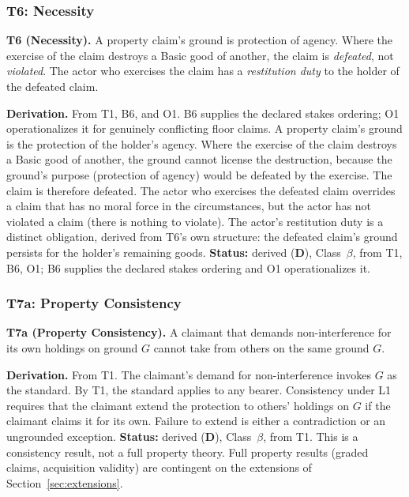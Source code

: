 \documentclass[11pt]{article}
\newcommand{\statusD}{\textcolor{stD}{\textbf{D}}}
\newcommand{\cb}{\texorpdfstring{Class~$\beta$}{Class beta}}
\begin{document}
\subsubsection{T6: Necessity}
\begin{paperbox}
\textbf{T6 (Necessity).} A property claim's ground is protection of agency. Where the exercise of the claim destroys a Basic good of another, the claim is \emph{defeated}, not \emph{violated}. The actor who exercises the claim has a \emph{restitution duty} to the holder of the defeated claim.
\end{paperbox}
\textbf{Derivation.} From T1, B6, and O1. B6 supplies the declared stakes ordering; O1 operationalizes it for genuinely conflicting floor claims. A property claim's ground is the protection of the holder's agency. Where the exercise of the claim destroys a Basic good of another, the ground cannot license the destruction, because the ground's purpose (protection of agency) would be defeated by the exercise. The claim is therefore defeated. The actor who exercises the defeated claim overrides a claim that has no moral force in the circumstances, but the actor has not violated a claim (there is nothing to violate). The actor's restitution duty is a distinct obligation, derived from T6's own structure: the defeated claim's ground persists for the holder's remaining goods. \textbf{Status:} derived (\statusD{}), \cb{}, from T1, B6, O1; B6 supplies the declared stakes ordering and O1 operationalizes it.

\subsubsection{T7a: Property Consistency}
\begin{paperbox}
\textbf{T7a (Property Consistency).} A claimant that demands non-interference for its own holdings on ground $G$ cannot take from others on the same ground $G$.
\end{paperbox}
\textbf{Derivation.} From T1. The claimant's demand for non-interference invokes $G$ as the standard. By T1, the standard applies to any bearer. Consistency under L1 requires that the claimant extend the protection to others' holdings on $G$ if the claimant claims it for its own. Failure to extend is either a contradiction or an ungrounded exception. \textbf{Status:} derived (\statusD{}), \cb{}, from T1. This is a consistency result, not a full property theory. Full property results (graded claims, acquisition validity) are contingent on the extensions of Section~\ref{sec:extensions}.
\end{document}
